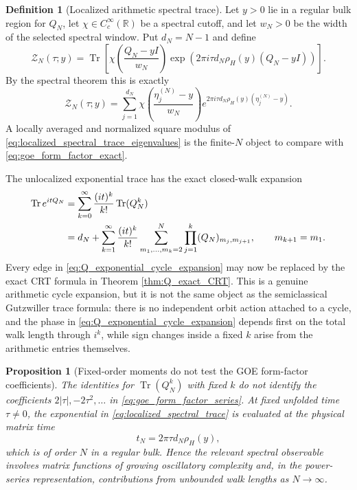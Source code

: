 \documentclass[11pt]{amsart}
\numberwithin{equation}{section}
\theoremstyle{plain}
\newtheorem{proposition}[theorem]{Proposition}
\theoremstyle{definition}
\newtheorem{definition}[theorem]{Definition}
\theoremstyle{remark}
\newcommand{\Tr}{\operatorname{Tr}}
\begin{document}
\begin{definition}[Localized arithmetic spectral trace]
\label{def:localized_spectral_trace}
Let $y>0$ lie in a regular bulk region for $Q_N$, let $\chi\in C_c^\infty(\mathbb R)$ be a spectral cutoff, and let $w_N>0$ be the width of the selected spectral window.  Put $d_N=N-1$ and define
\begin{equation}
\mathcal Z_N(\tau;y)
=
\Tr\!\left[
\chi\!\left(\frac{Q_N-yI}{w_N}\right)
\exp\!\left(
2\pi i\tau d_N\rho_H(y)(Q_N-yI)
\right)
\right].
\label{eq:localized_spectral_trace}
\end{equation}
By the spectral theorem this is exactly
\begin{equation}
\mathcal Z_N(\tau;y)
=
\sum_{j=1}^{d_N}
\chi\!\left(\frac{\eta_j^{(N)}-y}{w_N}\right)
 e^{2\pi i\tau d_N\rho_H(y)(\eta_j^{(N)}-y)}.
\label{eq:localized_spectral_trace_eigenvalues}
\end{equation}
A locally averaged and normalized square modulus of \eqref{eq:localized_spectral_trace_eigenvalues} is the finite-$N$ object to compare with \eqref{eq:goe_form_factor_exact}.
\end{definition}

The unlocalized exponential trace has the exact closed-walk expansion
\begin{align}
\Tr e^{itQ_N}
&=\sum_{k=0}^{\infty}\frac{(it)^k}{k!}\Tr(Q_N^k)\notag\\
&=d_N+
\sum_{k=1}^{\infty}\frac{(it)^k}{k!}
\sum_{m_1,\ldots,m_k=2}^{N}
\prod_{j=1}^{k}(Q_N)_{m_j,m_{j+1}},
\qquad m_{k+1}=m_1.
\label{eq:Q_exponential_cycle_expansion}
\end{align}
Every edge in \eqref{eq:Q_exponential_cycle_expansion} may now be replaced by the exact CRT formula in Theorem \ref{thm:Q_exact_CRT}.  This is a genuine arithmetic cycle expansion, but it is not the same object as the semiclassical Gutzwiller trace formula: there is no independent orbit action attached to a cycle, and the phase in \eqref{eq:Q_exponential_cycle_expansion} depends first on the total walk length through $i^k$, while sign changes inside a fixed $k$ arise from the arithmetic entries themselves.

\begin{proposition}[Fixed-order moments do not test the GOE form-factor coefficients]
\label{prop:fixed_moments_not_form_factor}
The identities for $\Tr(Q_N^k)$ with fixed $k$ do not identify the coefficients $2|\tau|,-2\tau^2,\ldots$ in \eqref{eq:goe_form_factor_series}.  At fixed unfolded time $\tau\ne0$, the exponential in \eqref{eq:localized_spectral_trace} is evaluated at the physical matrix time
\begin{equation}
t_N=2\pi\tau d_N\rho_H(y),
\label{eq:physical_matrix_time}
\end{equation}
which is of order $N$ in a regular bulk.  Hence the relevant spectral observable involves matrix functions of growing oscillatory complexity and, in the power-series representation, contributions from unbounded walk lengths as $N\to\infty$.
\end{proposition}
\end{document}
